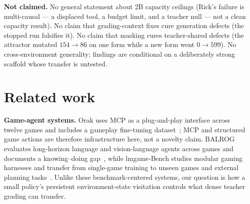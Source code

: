 \documentclass[11pt]{article}
\begin{document}
\textbf{Not claimed.} No general statement about 2B capacity ceilings (Rick's failure is
multi-causal --- a displaced tool, a budget limit, and a teacher null --- not a clean capacity
result). No claim that grading-context fixes cure generation defects (the stopped run falsifies
it). No claim that masking cures teacher-shared defects (the attractor mutated $154 \rightarrow
86$ on one form while a new form went $0 \rightarrow 599$). No cross-environment generality;
findings are conditional on a deliberately strong scaffold whose transfer is untested.

\section{Related work}
\textbf{Game-agent systems.} Orak uses MCP as a plug-and-play interface across twelve games and
includes a gameplay fine-tuning dataset~\cite{orak}; MCP and structured game actions are therefore
infrastructure here, not a novelty claim. BALROG evaluates long-horizon language and
vision-language agents across games and documents a knowing--doing gap~\cite{balrog}, while
lmgame-Bench studies modular gaming harnesses and transfer from single-game training to unseen
games and external planning tasks~\cite{lmgame}. Unlike these benchmark-centered systems, our
question is how a small policy's persistent environment-state visitation controls what dense
teacher grading can transfer.
\end{document}
